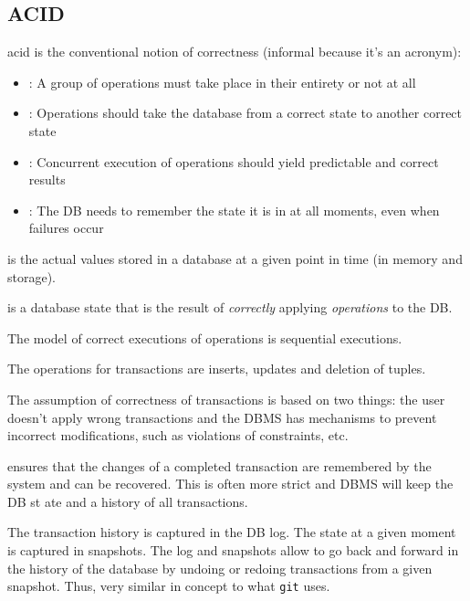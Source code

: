 \subsection{ACID}
\label{sec:acid}
\acrshort{acid} is the conventional notion of correctness (informal because it's an acronym):
\begin{itemize}
    \item {}: A group of operations must take place in their entirety or not at all
    \item {}: Operations should take the database from a correct state to another correct state
    \item {}: Concurrent execution of operations should yield predictable and correct results
    \item {}: The DB needs to remember the state it is in at all moments, even when failures occur
\end{itemize}


 is the actual values stored in a database at a given point in time (in memory and storage).

 is a database state that is the result of \textit{correctly} applying \textit{operations} to the DB.

 The model of correct executions of operations is sequential executions.

\inlinedefinition[Operations] The operations for transactions are inserts, updates and deletion of tuples.

\inlinedefinition[Consistency] The assumption of correctness of transactions is based on two things:
 the user doesn't apply wrong transactions and  the DBMS has mechanisms to prevent incorrect modifications, such as violations of constraints, etc.

\inlinedefinition[Durability] ensures that the changes of a completed transaction are remembered by the system and can be recovered.
This is often more strict and DBMS will keep the DB st ate and a history of all transactions.

The transaction history is captured in the DB log. The state at a given moment is captured in snapshots.
The log and snapshots allow to go back and forward in the history of the database by undoing or redoing transactions from a given snapshot.
Thus, very similar in concept to what \texttt{git} uses.


